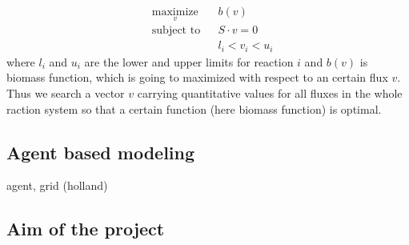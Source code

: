 \begin{equation*}
  \begin{aligned}
    & \underset{v}{\text{maximize}} & & b(v) \\
    & \text{subject to} & & S \cdot v = 0 \\
    & & & l_i < v_i < u_i
  \end{aligned}
\end{equation*}
where $l_i$ and $u_i$ are the lower and upper limits for reaction $i$ and $b(v)$ is biomass function, which is going to maximized with respect to an certain flux $v$.
Thus we search a vector $v$ carrying quantitative values for all fluxes in the whole raction system so that a certain function (here biomass function) is optimal.


\subsection{Agent based modeling}
agent, grid (holland)

\subsection{Aim of the project}

